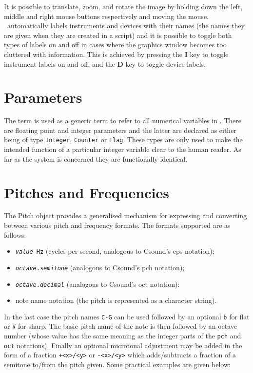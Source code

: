 It is possible to translate, zoom, and rotate the image by holding down the
left, middle and right mouse buttons respectively and moving the mouse.
\tao\ automatically labels instruments and devices with their names
(the names they are given when they are created in a script) and it is
possible to toggle both types of labels on and off in cases where the
graphics window becomes too cluttered with information. This is achieved
by pressing the \textbf{I} key to toggle instrument labels on and off,
and the \textbf{D} key to toggle device labels.

\section{Parameters}
\label{section:parameters}
The term \/ is used as a generic term to refer to all
numerical variables in \tao. There are floating point and integer parameters
and the latter are declared as either being of type \verb|Integer|,
\verb|Counter| or \verb|Flag|. These types are only used to make the
intended function of a particular integer variable clear to the human reader.
As far as the system is concerned they are functionally identical. 

\section{Pitches and Frequencies}
\label{section:pitches_and_frequencies}
The Pitch object provides a generalised mechanism for expressing and
converting between various pitch and frequency formats. The formats
supported are as follows:

\begin{itemize}
\item \texttt{\emph{value} Hz} (cycles per second, analogous to Csound's cps notation);
\item \texttt{\emph{octave}.\emph{semitone}} (analogous to Csound's pch notation);
\item \texttt{\emph{octave}.\emph{decimal}} (analogous to Csound's oct notation);
\item note name notation (the pitch is represented as a character string).
\end{itemize}

In the last case the pitch names \verb|C-G| can be used followed by an
optional \verb|b| for flat or \verb|#| for sharp. The basic pitch
name of the note is then followed by an octave number (whose value
has the same meaning as the integer parts of the \verb|pch| and
\verb|oct| notations).
Finally an optional microtonal adjustment may be added in the form of a
fraction \verb|+<x>/<y>| or \verb|-<x>/<y>|
which adds/subtracts a fraction of a semitone to/from the pitch given.
Some practical examples are given below:

